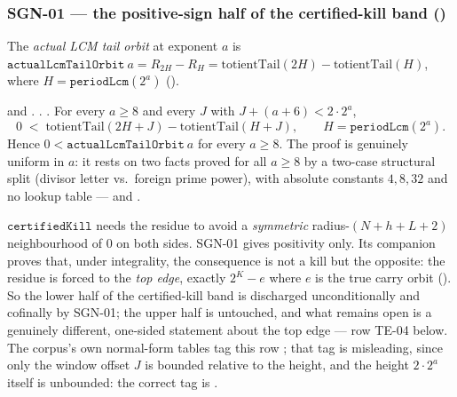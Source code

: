 \subsubsection{SGN-01 --- the positive-sign half of the certified-kill band ()}

\begin{defn}
The \emph{actual LCM tail orbit} at exponent $a$ is
$\mathtt{actualLcmTailOrbit}\ a = R_{2H}-R_H
=\mathrm{totientTail}(2H)-\mathrm{totientTail}(H)$, where $H = \mathtt{periodLcm}(2^a)$
().
\end{defn}

\begin{thm}
 and
. . .
For every $a\ge 8$ and every $J$ with $J+(a{+}6) < 2\cdot 2^a$,
\[
  0 \;<\; \mathrm{totientTail}(2H{+}J) - \mathrm{totientTail}(H{+}J), \qquad H=\mathtt{periodLcm}(2^a).
\]
Hence $0 < \mathtt{actualLcmTailOrbit}\ a$ for every $a\ge 8$. The proof is genuinely uniform in
$a$: it rests on two facts proved for all $a\ge 8$ by a two-case structural split (divisor letter
vs.\ foreign prime power), with absolute constants $4,8,32$ and no lookup table ---
 and
.
\end{thm}

\begin{rem}
$\mathtt{certifiedKill}$ needs the residue to avoid a \emph{symmetric} radius-$(N{+}h{+}L{+}2)$
neighbourhood of $0$ on both sides. SGN-01 gives positivity only. Its companion
 proves that,
under integrality, the consequence is not a kill but the opposite: the residue is forced to the
\emph{top edge}, exactly $2^K - e$ where $e$ is the true carry orbit (). So the
lower half of the certified-kill band is discharged unconditionally and cofinally by SGN-01; the
upper half is untouched, and what remains open is a genuinely different, one-sided statement about
the top edge --- row TE-04 below. The corpus's own normal-form tables tag this row
; that tag is misleading, since only the window offset $J$ is bounded relative to
the height, and the height $2\cdot 2^a$ itself is unbounded: the correct tag is .
\end{rem}

